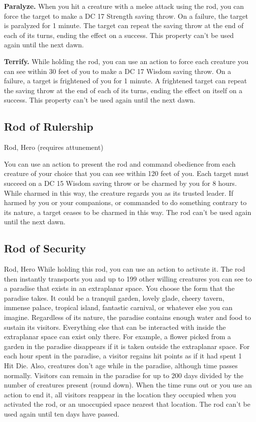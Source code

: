 \textbf{Paralyze.} When you hit a creature with a melee attack using the rod, you can force the target to make a DC 17 Strength saving throw. On a failure, the target is paralyzed for 1 minute. The target can repeat the saving throw at the end of each of its turns, ending the effect on a success. This property can't be used again until the next dawn.

\textbf{Terrify.} While holding the rod, you can use an action to force each creature you can see within 30 feet of you to make a DC 17 Wisdom saving throw. On a failure, a target is frightened of you for 1 minute. A frightened target can repeat the saving throw at the end of each of its turns, ending the effect on itself on a success. This property can't be used again until the next dawn.

\subsection{Rod of Rulership}
Rod, Hero (requires attunement)

You can use an action to present the rod and command obedience from each creature of your choice that you can see within 120 feet of you. Each target must succeed on a DC 15 Wisdom saving throw or be charmed by you for 8 hours. While charmed in this way, the creature regards you as its
trusted leader. If harmed by you or your companions, or commanded to do something contrary to its nature, a target ceases to be charmed in this way. The rod can't be used again until the next dawn.

\subsection{Rod of Security}
Rod, Hero While holding this rod, you can use an action to activate it. The rod then instantly transports you and up to 199 other willing creatures you can see to a paradise that exists in an extraplanar space. You choose the form that the paradise takes. It could be a tranquil garden, lovely glade, cheery tavern, immense palace, tropical island, fantastic carnival, or whatever else you can imagine. Regardless of its nature, the paradise contains enough water and food to sustain its visitors. Everything else that can be interacted with inside the extraplanar space can exist only there. For example, a flower picked from a garden in the paradise disappears if it is taken outside the extraplanar space.  For each hour spent in the paradise, a visitor regains hit points as if it had spent 1 Hit Die. Also, creatures don't age while in the paradise, although time passes normally. Visitors can remain in the paradise for up to 200 days divided by the number of creatures present (round down).  When the time runs out or you use an action to end it, all visitors reappear in the location they occupied when you activated the rod, or an unoccupied space nearest that location. The rod can't be used again until ten days have passed.

